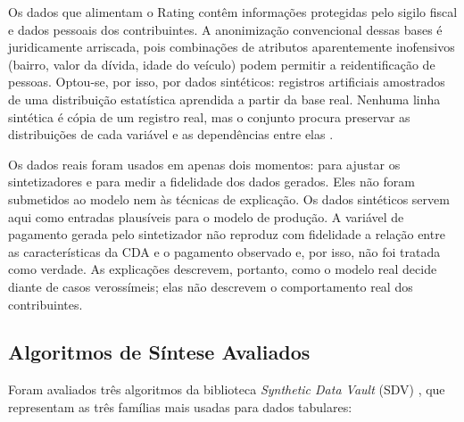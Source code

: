 Os dados que alimentam o Rating contêm informações protegidas pelo sigilo fiscal e dados pessoais dos contribuintes. A anonimização convencional dessas bases é juridicamente arriscada, pois combinações de atributos aparentemente inofensivos (bairro, valor da dívida, idade do veículo) podem permitir a reidentificação de pessoas. Optou-se, por isso, por dados sintéticos: registros artificiais amostrados de uma distribuição estatística aprendida a partir da base real. Nenhuma linha sintética é cópia de um registro real, mas o conjunto procura preservar as distribuições de cada variável e as dependências entre elas \cite{patkiSyntheticDataVault2016}.

Os dados reais foram usados em apenas dois momentos: para ajustar os sintetizadores e para medir a fidelidade dos dados gerados. Eles não foram submetidos ao modelo nem às técnicas de explicação. Os dados sintéticos servem aqui como entradas plausíveis para o modelo de produção. A variável de pagamento gerada pelo sintetizador não reproduz com fidelidade a relação entre as características da CDA e o pagamento observado e, por isso, não foi tratada como verdade. As explicações descrevem, portanto, como o modelo real decide diante de casos verossímeis; elas não descrevem o comportamento real dos contribuintes.

\subsection{Algoritmos de Síntese Avaliados}

Foram avaliados três algoritmos da biblioteca \textit{Synthetic Data Vault} (SDV) \cite{patkiSyntheticDataVault2016}, que representam as três famílias mais usadas para dados tabulares:

